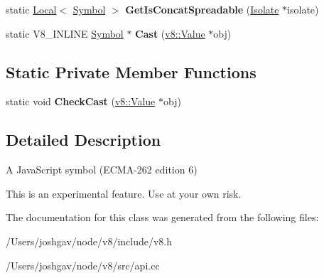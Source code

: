 \begin{DoxyCompactItemize}
\item 
static \hyperlink{classv8_1_1_local}{Local}$<$ \hyperlink{classv8_1_1_symbol}{Symbol} $>$ {\bfseries Get\+Is\+Concat\+Spreadable} (\hyperlink{classv8_1_1_isolate}{Isolate} $\ast$isolate)\hypertarget{classv8_1_1_symbol_aef1fcbe9dba9be84a552e74093c1dc2a}{}\label{classv8_1_1_symbol_aef1fcbe9dba9be84a552e74093c1dc2a}

\item 
static V8\+\_\+\+I\+N\+L\+I\+NE \hyperlink{classv8_1_1_symbol}{Symbol} $\ast$ {\bfseries Cast} (\hyperlink{classv8_1_1_value}{v8\+::\+Value} $\ast$obj)\hypertarget{classv8_1_1_symbol_a6bb214df5e2d8655379a648530aebaf1}{}\label{classv8_1_1_symbol_a6bb214df5e2d8655379a648530aebaf1}

\end{DoxyCompactItemize}
\subsection*{Static Private Member Functions}
\begin{DoxyCompactItemize}
\item 
static void {\bfseries Check\+Cast} (\hyperlink{classv8_1_1_value}{v8\+::\+Value} $\ast$obj)\hypertarget{classv8_1_1_symbol_a7d21a0477dccfa86ef569bcb01e70869}{}\label{classv8_1_1_symbol_a7d21a0477dccfa86ef569bcb01e70869}

\end{DoxyCompactItemize}


\subsection{Detailed Description}
A Java\+Script symbol (E\+C\+M\+A-\/262 edition 6)

This is an experimental feature. Use at your own risk. 

The documentation for this class was generated from the following files\+:\begin{DoxyCompactItemize}
\item 
/\+Users/joshgav/node/v8/include/v8.\+h\item 
/\+Users/joshgav/node/v8/src/api.\+cc\end{DoxyCompactItemize}
